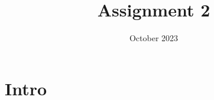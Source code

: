 \documentclass{article}
\title{Assignment 2}
\date{October 2023}
\begin{document}
\section{Intro}
\end{document}
